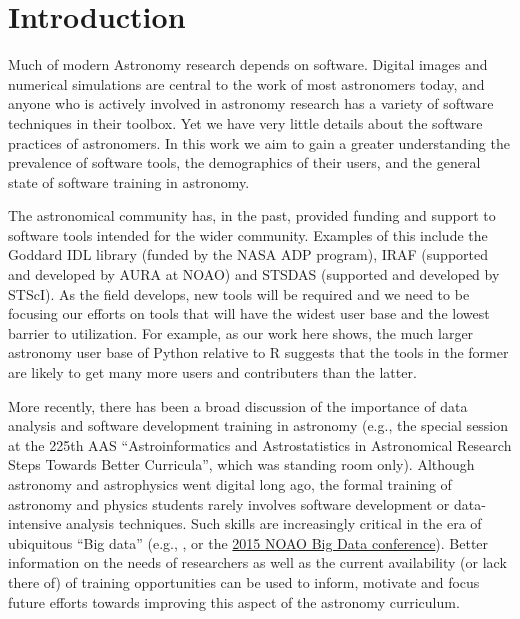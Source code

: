 \section{Introduction}
\label{sec:intro}

Much of modern Astronomy research depends on software. Digital images and numerical simulations are central to the work of most astronomers today, and anyone who is actively involved in astronomy research has a variety of software techniques in their toolbox. Yet we have very little details about the software practices of astronomers. In this work we aim to gain a greater understanding the prevalence of software tools, the demographics of their users, and the general state of software training in astronomy.

The astronomical community has, in the past, provided funding and support to software tools intended for the wider community. Examples of this include the Goddard IDL library (funded by the NASA ADP program), IRAF (supported and developed by AURA at NOAO) and STSDAS (supported and developed by STScI). As the field develops, new tools will be required and we need to be focusing our efforts on tools that will have the widest user base and the lowest barrier to utilization. For example, as our work here shows, the much larger astronomy user base of Python relative to R suggests that the tools in the former are likely to get many more users and contributers than the latter. 

More recently, there has been a broad discussion of the importance of data analysis and software development training in astronomy (e.g., the special session at the 225th AAS ``Astroinformatics and Astrostatistics in Astronomical Research Steps Towards Better Curricula'', which was standing room only). Although astronomy and astrophysics went digital long ago, the formal training of astronomy and physics students rarely involves software development or data-intensive analysis techniques. Such skills are increasingly critical in the era of ubiquitous ``Big data'' (e.g., \citet{Berriman_2011}, or the \href{http://www.noao.edu/meetings/bigdata/}{2015 NOAO Big Data conference}). Better information on the needs of researchers as well as the current availability (or lack there of) of training opportunities can be used to inform, motivate and focus future efforts towards improving this aspect of the astronomy curriculum. 

